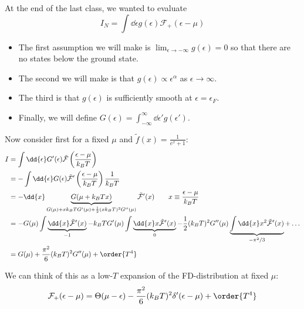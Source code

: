 \documentclass[a4paper,twoside,master.tex]{subfiles}
\begin{document}

At the end of the last class, we wanted to evaluate
\begin{equation}
    I_N = \int \dd{\epsilon} g(\epsilon) \mathcal{F}_{+}(\epsilon - \mu)
\end{equation}
 
\begin{itemize}
    \item The first assumption we will make is $ \lim_{\epsilon \to - \infty} g(\epsilon) = 0 $ so that there are no states below the ground state.
    \item The second we will make is that $ g(\epsilon) \propto \epsilon^{\alpha} $ as $ \epsilon \to \infty $.
    \item The third is that $ g(\epsilon) $ is sufficiently smooth at $ \epsilon = \epsilon_F $.
    \item Finally, we will define $ G(\epsilon) = \int_{- \infty}^{\infty} \dd{\epsilon'} g(\epsilon')  $.
\end{itemize}

Now consider first for a fixed $ \mu $ and $ \tilde{f}(x) = \frac{1}{e^x + 1} $:
\begin{align}
    I &= \int \dd{\epsilon} G'(\epsilon) \tilde{\mathcal{F}}\left(\frac{\epsilon - \mu}{k_B T}\right) \\
    &= - \int \dd{\epsilon} G(\epsilon) \tilde{\mathcal{F}}'\left( \frac{\epsilon - \mu}{k_B T} \right) \frac{1}{k_B T} \\
    &= - \dd{x} \underbrace{G(\mu + k_B T x)}_{G(\mu) + x k_B T G'(\mu) + \frac{1}{2}(x k_B T)^2 G''(\mu)} \tilde{\mathcal{F}}'(x) \qquad x \equiv \frac{\epsilon - \mu}{k_B T} \\
    &= - G(\mu) \int \underbrace{\dd{x} \tilde{\mathcal{F}}'(x)}_{-1} - k_B T G'(\mu) \int \underbrace{\dd{x} x \tilde{\mathcal{F}}'(x)}_{0} - \frac{1}{2} (k_B T)^2 G''(\mu) \underbrace{\int \dd{x} x^2 \tilde{\mathcal{F}}'(x)}_{- \pi^2 / 3} + \ldots \\
    &= G(\mu) + \frac{\pi^2}{6} (k_B T)^2 G''(\mu) + \order{T^4}
\end{align}

We can think of this as a low-$ T $ expansion of the FD-distribution at fixed $ \mu $:
\begin{equation}
    \mathcal{F}_+(\epsilon - \mu) = \Theta(\mu - \epsilon) - \frac{\pi^2}{6} (k_B T)^2 \delta'(\epsilon - \mu) + \order{T^4}
\end{equation}
\end{document}
